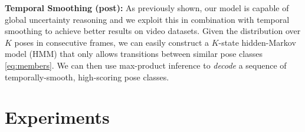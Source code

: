 \documentclass[letterpaper]{article} %
\begin{document}
{\bf Temporal Smoothing (post):} As previously shown, our model is capable of global uncertainty reasoning and we exploit this in combination with temporal smoothing to achieve better results on video datasets. Given the distribution over $K$ poses in consecutive frames, we can easily construct a $K$-state hidden-Markov model (HMM) that only allows transitions between similar pose classes \eqref{eq:members}. We can then use max-product inference to {\em decode} a sequence of temporally-smooth, high-scoring pose classes.

\section{Experiments}
\setcounter{secnumdepth}{2}




\end{document}
